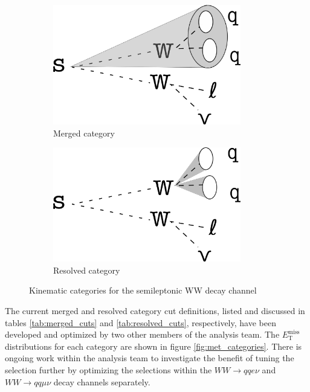 \documentclass[12pt]{article}
\newcommand*{\met}{\ensuremath{E_\text{T}^\text{miss}}}
\begin{document}
\begin{figure}[H]
     \centering
     \begin{subfigure}[b]{0.4\textwidth}
         \centering
         \includegraphics[width=0.9\textwidth]{figures/merged.png}
         \caption[]{Merged category}
         \label{fig:merged}
     \end{subfigure}
     \hfill
     \begin{subfigure}[b]{0.4\textwidth}
         \centering
         \includegraphics[width=0.9\textwidth]{figures/resolved.png}
         \caption[]{Resolved category}
         \label{fig:resolved}
     \end{subfigure}
\caption[]{Kinematic categories for the semileptonic WW decay channel}
\label{fig:lep_categories}
\end{figure}

The current merged and resolved category cut definitions, listed and discussed in tables \ref{tab:merged_cuts} and \ref{tab:resolved_cuts}, respectively, have been developed and optimized by two other members of the analysis team. The \met distributions for each category are shown in figure \ref{fig:met_categories}. There is ongoing work within the analysis team to investigate the benefit of tuning the selection further by optimizing the selections within the $WW\rightarrow qqe\nu$ and $WW\rightarrow qq\mu\nu$ decay channels separately.
\end{document}

